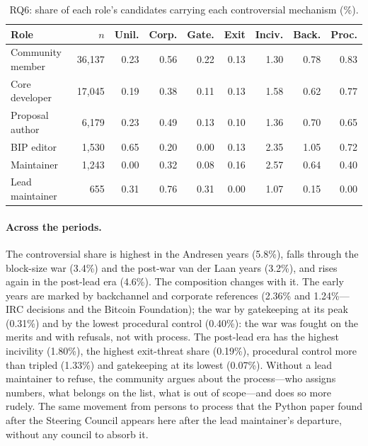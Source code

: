 \begin{table}[t]
\caption{RQ6: share of each role's candidates carrying each controversial mechanism (\%).}
\label{tab:rq6roles}
\footnotesize
\setlength{\tabcolsep}{3pt}
\begin{tabular}{lrrrrrrrr}
\toprule
Role & $n$ & Unil. & Corp. & Gate. & Exit & Inciv. & Back. & Proc. \\
\midrule
Community member & 36,137 & 0.23 & 0.56 & 0.22 & 0.13 & 1.30 & 0.78 & 0.83 \\
Core developer & 17,045 & 0.19 & 0.38 & 0.11 & 0.13 & 1.58 & 0.62 & 0.77 \\
Proposal author & 6,179 & 0.23 & 0.49 & 0.13 & 0.10 & 1.36 & 0.70 & 0.65 \\
BIP editor & 1,530 & 0.65 & 0.20 & 0.00 & 0.13 & 2.35 & 1.05 & 0.72 \\
Maintainer & 1,243 & 0.00 & 0.32 & 0.08 & 0.16 & 2.57 & 0.64 & 0.40 \\
Lead maintainer & 655 & 0.31 & 0.76 & 0.31 & 0.00 & 1.07 & 0.15 & 0.00 \\
\bottomrule
\end{tabular}
\end{table}

\paragraph{Across the periods.} The controversial share is highest in the Andresen years (5.8\%), falls through the block-size war (3.4\%) and the post-war van der Laan years (3.2\%), and rises again in the post-lead era (4.6\%). The composition changes with it. The early years are marked by backchannel and corporate references (2.36\% and 1.24\%---IRC decisions and the Bitcoin Foundation); the war by gatekeeping at its peak (0.31\%) and by the lowest procedural control (0.40\%): the war was fought on the merits and with refusals, not with process. The post-lead era has the highest incivility (1.80\%), the highest exit-threat share (0.19\%), procedural control more than tripled (1.33\%) and gatekeeping at its lowest (0.07\%). Without a lead maintainer to refuse, the community argues about the process---who assigns numbers, what belongs on the list, what is out of scope---and does so more rudely. The same movement from persons to process that the Python paper found after the Steering Council appears here after the lead maintainer's departure, without any council to absorb it.


